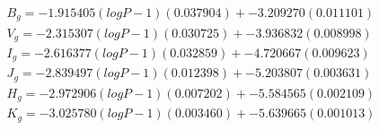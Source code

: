 \documentclass[12pt,a4paper]{article}
\begin{document}
\begin{align*}
	B_g = -1.915405 (logP-1) ( 0.037904) + -3.209270 ( 0.011101) \\
	V_g = -2.315307 (logP-1) ( 0.030725) + -3.936832 ( 0.008998) \\
	I_g = -2.616377 (logP-1) ( 0.032859) + -4.720667 ( 0.009623) \\
	J_g = -2.839497 (logP-1) ( 0.012398) + -5.203807 ( 0.003631) \\
	H_g = -2.972906 (logP-1) ( 0.007202) + -5.584565 ( 0.002109) \\
	K_g = -3.025780 (logP-1) ( 0.003460) + -5.639665 ( 0.001013) \\
\end{align*}
\end{document}
